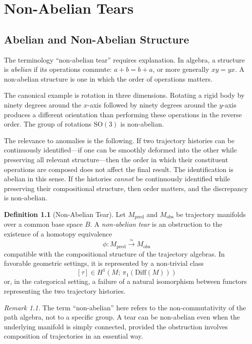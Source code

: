 \documentclass[12pt,oneside]{book}
\theoremstyle{plain}
\theoremstyle{definition}
\newtheorem{definition}[theorem]{Definition}
\theoremstyle{remark}
\newtheorem{remark}[theorem]{Remark}
\newcommand{\1}{\mathbf{1}}
\begin{document}
\chapter{Non-Abelian Tears}

\section{Abelian and Non-Abelian Structure}

The terminology ``non-abelian tear'' requires explanation. In algebra, a structure is \emph{abelian} if its operations commute: $a + b = b + a$, or more generally $xy = yx$. A non-abelian structure is one in which the order of operations matters.

The canonical example is rotation in three dimensions. Rotating a rigid body by ninety degrees around the $x$-axis followed by ninety degrees around the $y$-axis produces a different orientation than performing these operations in the reverse order. The group of rotations $\mathrm{SO}(3)$ is non-abelian.

The relevance to anomalies is the following. If two trajectory histories can be continuously identified---if one can be smoothly deformed into the other while preserving all relevant structure---then the order in which their constituent operations are composed does not affect the final result. The identification is abelian in this sense. If the histories \emph{cannot} be continuously identified while preserving their compositional structure, then order matters, and the discrepancy is non-abelian.

\begin{definition}[Non-Abelian Tear]
\label{def:tear}
Let $M_{\mathrm{pred}}$ and $M_{\mathrm{obs}}$ be trajectory manifolds over a common base space $B$. A \emph{non-abelian tear} is an obstruction to the existence of a homotopy equivalence
\[
\phi : M_{\mathrm{pred}} \xrightarrow{\;\simeq\;} M_{\mathrm{obs}}
\]
compatible with the compositional structure of the trajectory algebras. In favorable geometric settings, it is represented by a non-trivial class
\[
[\tau] \in H^1(M;\, \pi_1(\mathrm{Diff}(M)))
\]
or, in the categorical setting, a failure of a natural isomorphism between functors representing the two trajectory histories.
\end{definition}

\begin{remark}
The term ``non-abelian'' here refers to the non-commutativity of the path algebra, not to a specific group. A tear can be non-abelian even when the underlying manifold is simply connected, provided the obstruction involves composition of trajectories in an essential way.
\end{remark}
\end{document}
